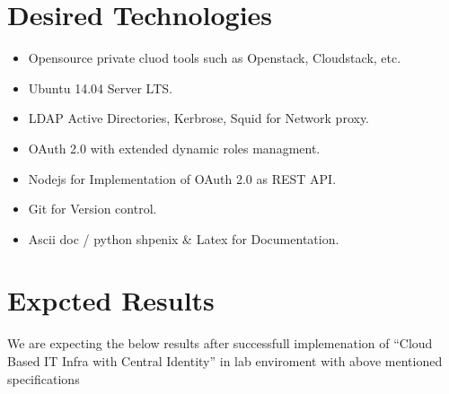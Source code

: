 \documentclass[12pt]{report}
\begin{document}
\section{Desired Technologies}

	\begin{itemize}
		\item Opensource private cluod tools such as Openstack, Cloudstack, etc.
		\item Ubuntu 14.04 Server LTS.
		\item LDAP Active Directories, Kerbrose, Squid for Network proxy.
		\item OAuth 2.0 with extended dynamic roles managment.
		\item Nodejs for Implementation of OAuth 2.0 as REST API.
		\item Git for Version control. 
		\item Ascii doc / python shpenix \& Latex for Documentation.
	\end{itemize}
	
\section{Expcted Results}

	We are expecting the below results after successfull implemenation of ``Cloud Based IT Infra with Central Identity'' in lab enviroment with above mentioned specifications
\end{document}
